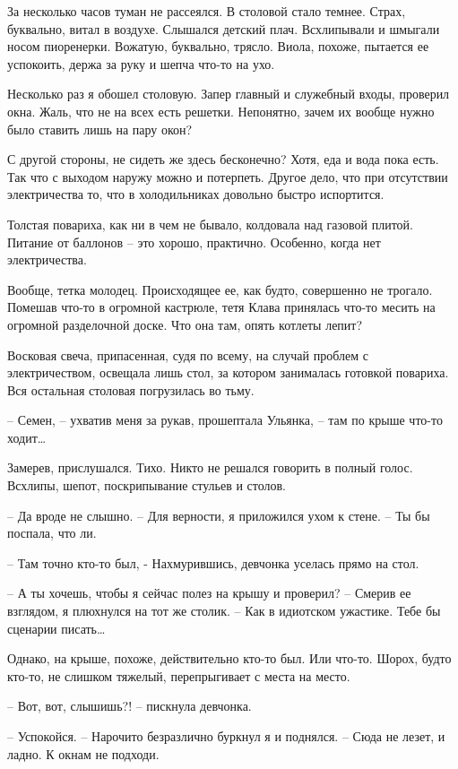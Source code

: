 \documentclass[a4paper]{book}
\begin{document}
За несколько часов туман не рассеялся. В столовой стало темнее. Страх, буквально, витал в воздухе. Слышался детский плач. Всхлипывали и шмыгали носом пиоренерки. Вожатую, буквально, трясло. Виола, похоже, пытается ее успокоить, держа за руку и шепча что-то на ухо. 

Несколько раз я обошел столовую. Запер главный и служебный входы, проверил окна. Жаль, что не на всех есть решетки. Непонятно, зачем их вообще нужно было ставить лишь на пару окон?

С другой стороны, не сидеть же здесь бесконечно? Хотя, еда и вода пока есть. Так что с выходом наружу можно и потерпеть. Другое дело, что при отсутствии электричества то, что в холодильниках довольно быстро испортится. 

Толстая повариха, как ни в чем не бывало, колдовала над газовой плитой. Питание от баллонов -- это хорошо, практично. Особенно, когда нет электричества. 

Вообще, тетка молодец. Происходящее ее, как будто, совершенно не трогало. Помешав что-то в огромной кастрюле, тетя Клава принялась что-то месить на огромной разделочной доске. Что она там, опять котлеты лепит? 

Восковая свеча, припасенная, судя по всему, на случай проблем с электричеством, освещала лишь стол, за котором занималась готовкой повариха. Вся остальная столовая погрузилась во тьму.


-- Семен, -- ухватив меня за рукав, прошептала Ульянка, -- там по крыше что-то ходит\ldots

Замерев, прислушался. Тихо. Никто не решался говорить в полный голос. Всхлипы, шепот, поскрипывание стульев и столов. 

-- Да вроде не слышно. -- Для верности, я приложился ухом к стене. -- Ты бы поспала, что ли. 

-- Там точно кто-то был, - Нахмурившись, девчонка уселась прямо на стол. 

-- А ты хочешь, чтобы я сейчас полез на крышу и проверил? -- Смерив ее взглядом, я плюхнулся на тот же столик. -- Как в идиотском ужастике. Тебе бы сценарии писать\ldots

Однако, на крыше, похоже, действительно кто-то был. Или что-то. Шорох, будто кто-то, не слишком тяжелый, перепрыгивает с места на место. 

-- Вот, вот, слышишь?! -- пискнула девчонка. 

-- Успокойся. -- Нарочито безразлично буркнул я и поднялся. -- Сюда не лезет, и ладно. К окнам не подходи.
\end{document}

